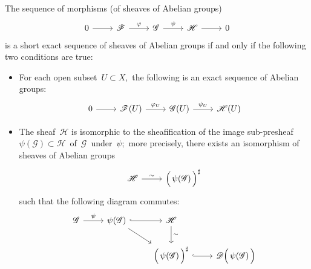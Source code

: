 
\begin{theorem}
\mbox{}\vskip 0.1cm
\noindent
The sequence of morphisms (of sheaves of Abelian groups)
\begin{equation*}
\begin{tikzcd}
0                 \arrow[r] &
\mathscr{F} \arrow[r, "\varphi"] &
\mathscr{G} \arrow[r, "\psi"] &
\mathscr{H} \arrow[r] &
0
\end{tikzcd}
\end{equation*}
is a short exact sequence of sheaves of Abelian groups
if and only if the following two conditions are true:
\begin{itemize}
\item
	For each open subset \,$U \subset X$,\, the following is an exact sequence of Abelian groups:
	\begin{equation*}
	\begin{tikzcd}
	0                 \arrow[r] &
	\mathscr{F}(U) \arrow[r, "\varphi_{U}"] &
	\mathscr{G}(U) \arrow[r, "\psi_{U}"] &
	\mathscr{H}(U)
	\end{tikzcd}
	\end{equation*}
\item
	The sheaf \,$\mathscr{H}$ is isomorphic to the sheafification of the image sub-presheaf
	\,$\psi(\mathscr{G}) \subset \mathscr{H}$\,
	of \,$\mathscr{G}$\, under \,$\psi$;\, more precisely, there exists an isomorphism of sheaves of Abelian groups
	\begin{equation*}
	\begin{tikzcd}
	\mathscr{H} \arrow[r, "\sim"] & \left(\,\overset{{\color{white}.}}{\psi(\mathscr{G})}\,\right)^{\sharp}
	\end{tikzcd}
	\end{equation*}
	such that the following diagram commutes:
	\begin{equation*}
	\begin{tikzcd}
	\mathscr{G} \arrow[r, "\psi"] & \psi(\mathscr{G}) \arrow[r, hook] \arrow[dr] & \mathscr{H} \arrow[d, "\sim"]
	\\
	&& \left(\,\overset{{\color{white}.}}{\psi(\mathscr{G})}\,\right)^{\sharp} \arrow[r, hook] & \mathscr{D}\!\left(\,\overset{{\color{white}.}}{\psi(\mathscr{G})}\,\right)
	\end{tikzcd}
	\end{equation*}
\end{itemize}
\end{theorem}
\proof

